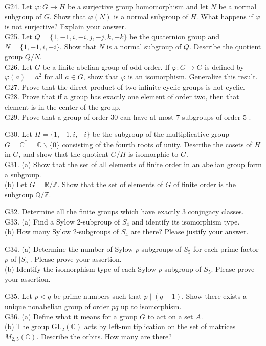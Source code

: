 G24. Let $\varphi: G \rightarrow H$ be a surjective group homomorphism and let $N$ be a normal subgroup of $G$. Show that $\varphi(N)$ is a normal subgroup of $H$. What happens if $\varphi$ is not surjective? Explain your answer.\\
G25. Let $Q=\{1,-1, i,-i, j,-j, k,-k\}$ be the quaternion group and $N=\{1,-1, i,-i\}$. Show that $N$ is a normal subgroup of $Q$. Describe the quotient group $Q / N$.\\
G26. Let $G$ be a finite abelian group of odd order. If $\varphi: G \rightarrow G$ is defined by $\varphi(a)=a^{2}$ for all $a \in G$, show that $\varphi$ is an isomorphism. Generalize this result.\\
G27. Prove that the direct product of two infinite cyclic groups is not cyclic.\\
G28. Prove that if a group has exactly one element of order two, then that element is in the center of the group.\\
G29. Prove that a group of order 30 can have at most 7 subgroups of order 5 .

G30. Let $H=\{1,-1, i,-i\}$ be the subgroup of the multiplicative group $G=\mathbb{C}^{*}=\mathbb{C} \backslash\{0\}$ consisting of the fourth roots of unity. Describe the cosets of $H$ in $G$, and show that the quotient $G / H$ is isomorphic to $G$.\\
G31. (a) Show that the set of all elements of finite order in an abelian group form a subgroup.\\
(b) Let $G=\mathbb{R} / \mathbb{Z}$. Show that the set of elements of $G$ of finite order is the subgroup $\mathbb{Q} / \mathbb{Z}$.

G32. Determine all the finite groups which have exactly 3 conjugacy classes.\\
G33. (a) Find a Sylow 2-subgroup of $S_{4}$ and identify its isomorphism type.\\
(b) How many Sylow 2-subgroups of $S_{4}$ are there? Please justify your answer.

G34. (a) Determine the number of Sylow $p$-subgroups of $S_{5}$ for each prime factor $p$ of $\left|S_{5}\right|$. Please prove your assertion.\\
(b) Identify the isomorphism type of each Sylow $p$-subgroup of $S_{5}$. Please prove your assertion.

G35. Let $p<q$ be prime numbers such that $p \mid(q-1)$. Show there exists a unique nonabelian group of order $p q$ up to isomorphism.\\
G36. (a) Define what it means for a group $G$ to act on a set $A$.\\
(b) The group $\mathrm{GL}_{2}(\mathbb{C})$ acts by left-multiplication on the set of matrices $M_{2,5}(\mathbb{C})$. Describe the orbits. How many are there?